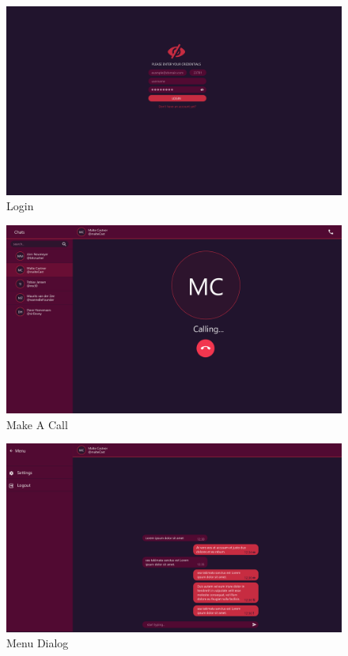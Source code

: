 \begin{figure}[h]
    \centering
    \includegraphics[width=1.0\textwidth]{./graphics/wireframes/Login}
    \caption{Login}
    \label{fig:figure23}
\end{figure}

\begin{figure}[h]
    \centering
    \includegraphics[width=1.0\textwidth]{./graphics/wireframes/MakeACall}
    \caption{Make A Call}
    \label{fig:figure24}
\end{figure}

\begin{figure}[h]
    \centering
    \includegraphics[width=1.0\textwidth]{./graphics/wireframes/MenuDialog}
    \caption{Menu Dialog}
    \label{fig:figure25}
\end{figure}

